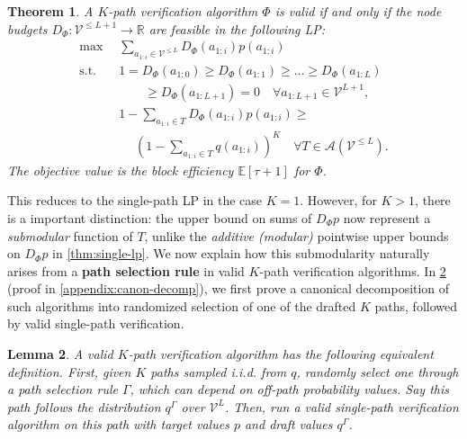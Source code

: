 \documentclass{article}
\theoremstyle{plain}
\newtheorem{theorem}{Theorem}[section]
\newtheorem{lemma}[theorem]{Lemma}
\theoremstyle{definition}
\theoremstyle{remark}
\newcommand{\V}{\mathcal{V}}
\begin{document}
\begin{theorem}A $K$-path verification algorithm $\Phi$ is valid if and only if the node budgets $D_\Phi:\V^{\leq L+1} \to \mathbb{R}$ are \emph{feasible} in the following LP:
    \begin{align}
        \max &\sum_{a_{1:i} \in \V^{\leq L}} D_\Phi(a_{1:i}) p(a_{1:i}) \\
        \text{s.t.}\quad& 1=D_\Phi(a_{1:0}) \geq D_\Phi(a_{1:1}) \geq \ldots \geq D_\Phi(a_{1:L}) \\
        & \quad \quad \geq D_\Phi(a_{1:L+1})= 0 \quad \forall a_{1:L+1} \in \V^{L+1},\\
        & 1 - \sum_{a_{1:i} \in T} D_\Phi(a_{1:i})p(a_{1:i}) \geq \\
        &\quad \; \left(1-\sum_{a_{1:i} \in T} q(a_{1:i})\right)^K \quad \forall T \in \mathcal{A}(\V^{\leq L}).
    \end{align}
The objective value is the block efficiency $\mathbb{E}[\tau+1]$ for $\Phi$.
\label{thm:multi-lp}
\end{theorem}
This reduces to the single-path LP in the case $K=1$. However, for $K>1$, there is a important distinction: the upper bound on sums of $D_\Phi p$ now represent a \emph{submodular} function of $T$, unlike the \emph{additive (modular)} pointwise upper bounds on $D_\Phi p$ in \cref{thm:single-lp}. We now explain how this submodularity naturally arises from a \textbf{path selection rule} in valid $K$-path verification algorithms. In \cref{lem:canon-decomp} (proof in \cref{appendix:canon-decomp}), we first prove a canonical decomposition of such algorithms into randomized selection of one of the drafted $K$ paths, followed by valid single-path verification.

\begin{lemma}
    A valid $K$-path verification algorithm has the following equivalent definition. First, given $K$ paths sampled i.i.d. from $q$, randomly select one through a path selection rule $\Gamma$, which can depend on off-path probability values. Say this path follows the distribution $q^\Gamma$ over $\V^L$. Then, run a valid single-path verification algorithm on this path with target values $p$ and draft values $q^\Gamma$.
    \label{lem:canon-decomp}
\end{lemma}
\end{document}
